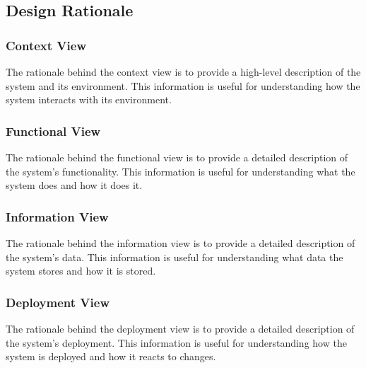 \documentclass[a4paper]{article}
\begin{document}
    \subsection{Design Rationale}
    \subsubsection{Context View}
    The rationale behind the context view is to provide a high-level description of the system and its environment. This
    information is useful for understanding how the system interacts with its environment.

    \subsubsection{Functional View}
    The rationale behind the functional view is to provide a detailed description of the system's functionality. This information
    is useful for understanding what the system does and how it does it.

    \subsubsection{Information View}
    The rationale behind the information view is to provide a detailed description of the system's data. This information is
    useful for understanding what data the system stores and how it is stored.

    \subsubsection{Deployment View}
    The rationale behind the deployment view is to provide a detailed description of the system's deployment. This information is
    useful for understanding how the system is deployed and how it reacts to changes.
\end{document}
